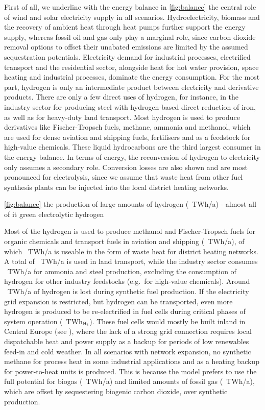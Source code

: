 First of all, we underline with the energy balance in \cref{fig:balance} the
central role of wind and solar electricity supply in all scenarios.
Hydroelectricity, biomass and the recovery of ambient heat through heat pumps
further support the energy supply, whereas fossil oil and gas only play a
marginal role, since carbon dioxide removal options to offset their unabated
emissions are limited by the assumed sequestration potentials. Electricity
demand for industrial processes, electrified transport and the residential
sector, alongside heat for hot water provision, space heating and industrial
processes, dominate the energy consumption. For the most part, hydrogen is only
an intermediate product between electricity and derivative products. There are
only a few direct uses of hydrogen, for instance, in the industry sector for
producing steel with hydrogen-based direct reduction of iron, as well as for
heavy-duty land transport. Most hydrogen is used to produce derivatives like
Fischer-Tropsch fuels, methane, ammonia and methanol, which are used for dense
aviation and shipping fuels, fertilisers and as a feedstock for high-value
chemicals. These liquid hydrocarbons are the third largest consumer in the
energy balance. In terms of energy, the reconversion of hydrogen to electricity
only assumes a secondary role. Conversion losses are also shown and are most
pronounced for electrolysis, since we assume that waste heat from other fuel
synthesis plants can be injected into the local district heating networks.

\cref{fig:balance}
the production of large amounts of hydrogen (\hydrogenproduction~TWh/a) - almost
all of it green electrolytic hydrogen

Most of the hydrogen is used to produce methanol and Fischer-Tropsch fuels for
organic chemicals and transport fuels in aviation and shipping
(\ptlhydrogenusage~TWh/a), of which \ptlwasteheat~TWh/a is useable  in the form
of waste heat for district heating networks. A total of
\hydrogentransportdemand~TWh/a is used in land transport, while the industry
sector consumes \hydrogenindustrydemand~TWh/a for ammonia and steel production,
excluding the consumption of hydrogen for other industry feedstocks (e.g.~for
high-value chemicals). Around \hydrogenlosses~TWh/a of hydrogen is lost during
synthetic fuel production. If the electricity grid expansion is restricted, but
hydrogen can be transported, even more hydrogen is produced to be re-electrified
in fuel cells during critical phases of system operation
(\hydrogenfuelcell~TWh$_{\ce{H2}}$). These fuel cells would mostly be built
inland in Central Europe (see ), where the lack of a strong grid
connection requires local dispatchable heat and power supply as a backup for
periods of low renewables feed-in and cold weather. In all scenarios with
network expansion, no synthetic methane for process heat in some industrial
applications and as a heating backup for power-to-heat units is produced. This
is because the model prefers to use the full potential for biogas
(\biogas~TWh/a) and limited amounts of fossil gas (\fossilgas~TWh/a), which are
offset by sequestering biogenic carbon dioxide, over synthetic production.

